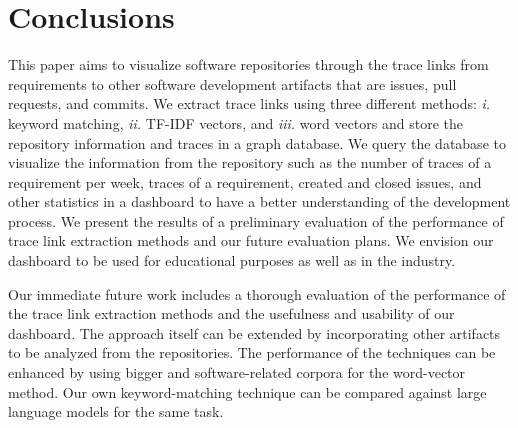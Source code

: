 \section{Conclusions}
\label{sec:conc}

This paper aims to visualize software repositories through the trace links from requirements to other software development artifacts that are issues, pull requests, and commits. We extract trace links using three different methods: \emph{i.} keyword matching, \emph{ii.} TF-IDF vectors, and \emph{iii.} word vectors and store the repository information and traces in a graph database. We query the database to visualize the information from the repository such as the number of traces of a requirement per week, traces of a requirement, created and closed issues, and other statistics in a dashboard to have a better understanding of the development process. We present the results of a preliminary evaluation of the performance of trace link extraction methods and our future evaluation plans. We envision our dashboard to be used for educational purposes as well as in the industry.

Our immediate future work includes a thorough evaluation of the performance of the trace link extraction methods and the usefulness and usability of our dashboard. The approach itself can be extended by incorporating other artifacts to be analyzed from the repositories. The performance of the techniques can be enhanced by using bigger and software-related corpora for the word-vector method. Our own keyword-matching technique can be compared against large language models for the same task.
